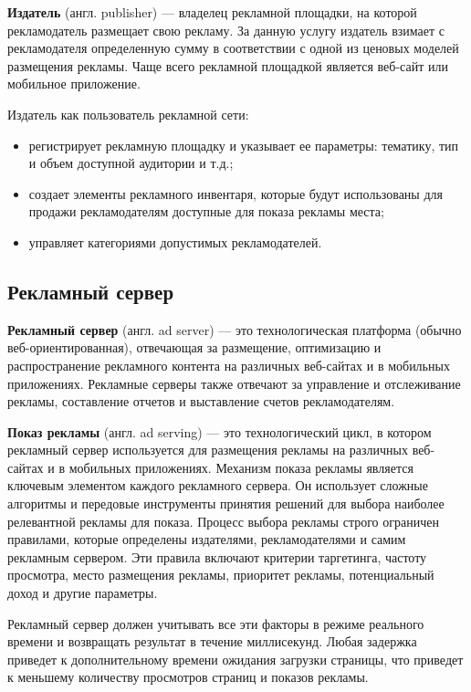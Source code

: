 \documentclass[specification,annotation,times]{itmo-student-thesis}
\begin{document}
\textbf{Издатель} (англ. publisher) — владелец рекламной площадки, на которой рекламодатель размещает свою рекламу. За данную услугу издатель взимает с рекламодателя определенную сумму в соответствии с одной из ценовых моделей размещения рекламы. Чаще всего рекламной площадкой является веб-сайт или мобильное приложение.

Издатель как пользователь рекламной сети:
\begin{itemize}
\item регистрирует рекламную площадку и указывает ее параметры: тематику, тип и объем доступной аудитории и т.д.;
\item создает элементы рекламного инвентаря, которые будут использованы для продажи рекламодателям доступные для показа рекламы места;
\item управляет категориями допустимых рекламодателей.
\end{itemize}

\subsection{Рекламный сервер} 

\textbf{Рекламный сервер} (англ. ad server) \label{ad-server} — это технологическая платформа (обычно веб-ориентированная), отвечающая за размещение, оптимизацию и распространение рекламного контента на различных веб-сайтах и в мобильных приложениях. Рекламные серверы также отвечают за управление и отслеживание рекламы, составление отчетов и выставление счетов рекламодателям.

\textbf{Показ рекламы} (англ. ad serving)\label{ad-serving} — это технологический цикл, в котором рекламный сервер используется для размещения рекламы на различных веб-сайтах и в мобильных приложениях. Механизм показа рекламы является ключевым элементом каждого рекламного сервера. Он использует сложные алгоритмы и передовые инструменты принятия решений для выбора наиболее релевантной рекламы для показа. Процесс выбора рекламы строго ограничен правилами, которые определены издателями, рекламодателями и самим рекламным сервером. Эти правила включают критерии таргетинга, частоту просмотра, место размещения рекламы, приоритет рекламы, потенциальный доход и другие параметры. 

Рекламный сервер должен учитывать все эти факторы в режиме реального времени и возвращать результат в течение миллисекунд. Любая задержка приведет к дополнительному времени ожидания загрузки страницы, что приведет к меньшему количеству просмотров страниц  и показов рекламы.
\end{document}
